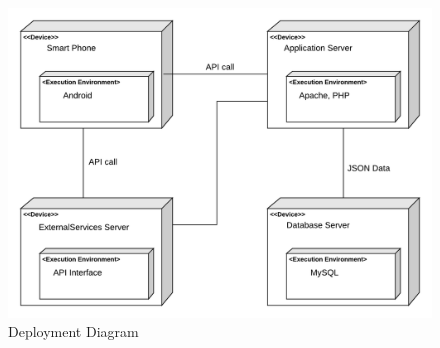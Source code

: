 \begin{figure}[H]
	\begin{center}
		\includegraphics[width=\textwidth]{./DD_Diagrams/Deployment.png}
      \caption{Deployment Diagram}
        \label{TrackMe_depdia}
	\end{center}
\end{figure}